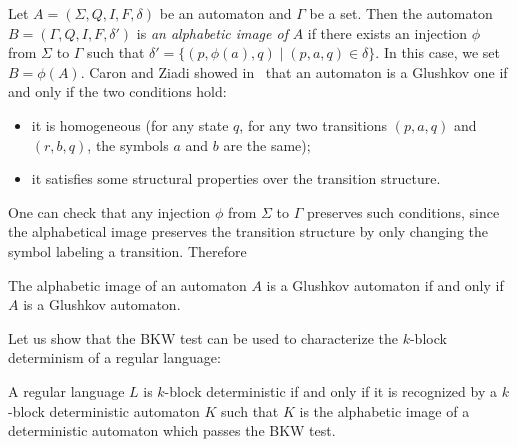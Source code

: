 \documentclass{llncs}
\begin{document}
	Let $A=(\Sigma,Q,I,F,\delta)$ be an automaton and $\Gamma$ be a set. Then the automaton $B=(\Gamma,Q,I,F,\delta')$ is \emph{an alphabetic image of} $A$ if there exists an injection $\phi$ from $\Sigma$ to $\Gamma$ such that $\delta'=\{(p,\phi(a),q)\mid (p,a,q) \in\delta\}$. In this case, we set $B=\phi(A)$.	
Caron and Ziadi showed in~\cite{CZ97} that an automaton is a Glushkov one if and only if the two conditions hold:
\begin{itemize}
  \item it is homogeneous (for any state $q$, for any two transitions $(p,a,q)$ and $(r,b,q)$, the symbols $a$ and $b$ are the same);
  \item it satisfies some structural properties over the transition structure.
\end{itemize}
One can check that any injection $\phi$ from $\Sigma$ to $\Gamma$ preserves such conditions, since
the alphabetical image preserves the transition structure by only changing the symbol labeling a transition.
Therefore 
	\begin{lemma}\label{lm:ImageGlushkov}
	  The alphabetic image of an automaton $A$ is a Glushkov automaton if and only if $A$ is a Glushkov automaton. 
	\end{lemma}	
	Let us show that the BKW test can be used to characterize the $k$-block determinism of a regular language:
\begin{theorem}\label{th:KBD}
	A regular language $L$ is $k$-block deterministic if and only if it is recognized by a $k$-block deterministic automaton $K$ such that $K$ is the alphabetic image of a deterministic automaton which passes the BKW test.
\end{theorem}
\end{document}
